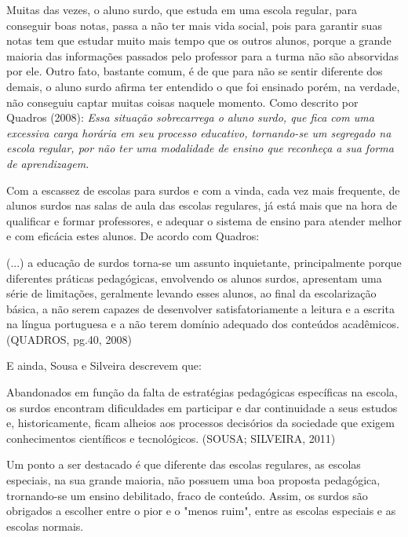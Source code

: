 \documentclass[brasil]{abnt}
\begin{document}
	Muitas das vezes, o aluno surdo, que estuda em uma escola regular, para conseguir boas notas, passa a não ter mais vida social, pois para garantir suas notas tem que estudar
	muito mais tempo que os outros alunos, porque a grande maioria das informações passados pelo professor para a turma não são absorvidas por ele. Outro fato, bastante comum, é
	de que para não se sentir diferente dos demais, o aluno surdo afirma ter entendido o que foi ensinado porém, na verdade, não conseguiu captar muitas coisas naquele momento.
	Como descrito por Quadros (2008): \textit{Essa situação sobrecarrega o aluno surdo, que fica com uma excessiva carga horária em seu processo educativo, tornando-se um segregado na 
	escola regular, por não ter uma modalidade de ensino que reconheça a sua forma de aprendizagem.}
	
	Com a escassez de escolas para surdos e com a vinda, cada vez mais frequente, de alunos surdos nas salas de aula das escolas regulares, já está mais que na hora de 
	qualificar e formar professores, e adequar o sistema de ensino para atender melhor e com eficácia estes alunos. De acordo com Quadros:
	
		\begin{citacao}(...) a educação de surdos torna-se um assunto inquietante, principalmente porque diferentes práticas pedagógicas, envolvendo os alunos surdos, apresentam
						uma série de limitações, geralmente levando esses alunos, ao final da escolarização básica, a não serem capazes de desenvolver satisfatoriamente a leitura 
						e a escrita na língua portuguesa e a não terem domínio adequado dos conteúdos acadêmicos. (QUADROS, pg.40, 2008)
		\end{citacao}
	
	E ainda, Sousa e Silveira descrevem que:
	
		\begin{citacao} Abandonados em função da falta de estratégias pedagógicas específicas na escola, os surdos encontram dificuldades em participar e dar continuidade a
						seus estudos e, historicamente, ficam alheios aos processos decisórios da sociedade que exigem conhecimentos científicos e tecnológicos. (SOUSA; SILVEIRA, 2011)
		\end{citacao}
	
	Um ponto a ser destacado é que diferente das escolas regulares, as escolas especiais, na sua grande maioria, não possuem uma boa proposta pedagógica, trornando-se um ensino
	debilitado, fraco de conteúdo. Assim, os surdos são obrigados a escolher entre o pior e o "menos ruim", entre as escolas especiais e as escolas normais.
	
\end{document}
